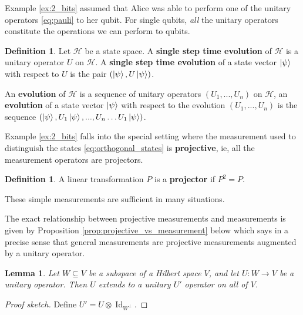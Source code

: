 \documentclass[12pt]{article}
\theoremstyle{plain}
\newtheorem{lemma}[thm]{Lemma}
\theoremstyle{definition}
\newtheorem{defn}[thm]{Definition} %
\newcommand{\call}[1]{\mathcal{#1}}
\newcommand{\lto}{\longrightarrow}
\begin{document}
	Example \ref{ex:2_bits} assumed that Alice was able to perform one of the unitary operators \eqref{eq:pauli} to her qubit. For single qubits, \emph{all} the unitary operators constitute the operations we can perform to qubits.
	
	\begin{defn}\label{def:time_evolution}
		Let $\call{H}$ be a state space. A \textbf{single step time evolution} of $\call{H}$ is a unitary operator $U$ on $\call{H}$. A \textbf{single step time evolution} of a state vector $\ket{\psi}$ with respect to $U$ is the pair $(\ket{\psi},U\ket{\psi})$.
		
		An \textbf{evolution} of $\call{H}$ is a sequence of unitary operators $(U_1,...,U_n)$ on $\call{H}$, an \textbf{evolution} of a state vector $\ket{\psi}$ with respect to the evolution $(U_1,...,U_n)$ is the sequence $(\ket{\psi},U_1\ket{\psi},...,U_n\hdots U_1\ket{\psi})$.
	\end{defn}
	
	Example \ref{ex:2_bits} falls into the special setting where the measurement used to distinguish the states \eqref{eq:orthogonal_states} is \textbf{projective}, ie, all the measurement operators are projectors.
	
	\begin{defn}
		A linear transformation $P$ is a \textbf{projector} if $P^2 = P$.
	\end{defn}
	
	These simple measurements are sufficient in many situations.
	
	The exact relationship between projective measurements and measurements is given by Proposition \ref{prop:projective_vs_measurement} below which says in a precise sense that general measurements are projective measurements augmented by a unitary operator.
	
	\begin{lemma}\label{lem:unitary_extension}
		Let $W \subseteq V$ be a subspace of a Hilbert space $V$, and let $U: W \lto V$ be a unitary operator. Then $U$ extends to a unitary $U'$ operator on all of $V$.
	\end{lemma}
	\begin{proof}[Proof sketch]
		Define $U' = U\otimes \operatorname{Id}_{W^{\perp}}$.
	\end{proof}
	
\end{document}
